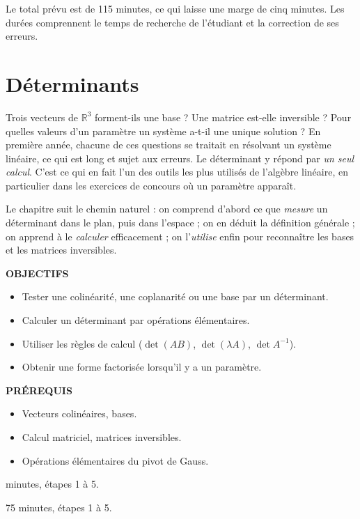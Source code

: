 \documentclass[a4paper,11pt]{article}
\numberwithin{equation}{section}
\numberwithin{figure}{section}
\numberwithin{table}{section}
\theoremstyle{enonce}
\theoremstyle{exemple}
\theoremstyle{remarque}
\newcommand{\ouverture}[3]{%
  \begin{tcolorbox}[enhanced,colback=Fond,colframe=Fond,arc=0pt,boxrule=0pt,left=12pt,right=12pt,top=10pt,bottom=10pt,
     before skip=1.2em,after skip=1.6em]
  \begin{minipage}[t]{0.56\linewidth}
  {\sffamily\bfseries\small\color{Bleu}OBJECTIFS}\par\vspace{0.3em}\small #1
  \end{minipage}\hfill
  \begin{minipage}[t]{0.38\linewidth}
  {\sffamily\bfseries\small\color{Bleu}PRÉREQUIS}\par\vspace{0.3em}\small #2
  \ifx\relax#3\relax\else\par\vspace{0.6em}{\sffamily\bfseries\small\color{Bleu}DURÉE}\par\vspace{0.2em}\small #3\fi
  \end{minipage}
  \end{tcolorbox}}
\newcommand{\R}{\mathbb{R}}
\newif\ifonglets \ongletsfalse
\begin{document}
Le total prévu est de 115 minutes, ce qui laisse une marge de cinq minutes. Les durées comprennent le temps de
recherche de l'étudiant et la correction de ses erreurs.

\clearpage
\thispagestyle{plain}
\hypertarget{toc}{}
\renewcommand{\contentsname}{Sommaire}
\tableofcontents
\clearpage
{}
\ongletstrue

\clearpage
\section{Déterminants}

Trois vecteurs de $\R^3$ forment-ils une base ? Une matrice est-elle inversible ? Pour quelles valeurs d'un paramètre
un système a-t-il une unique solution ? En première année, chacune de ces questions se traitait en résolvant un
système linéaire, ce qui est long et sujet aux erreurs. Le déterminant y répond par \emph{un seul calcul}. C'est ce qui
en fait l'un des outils les plus utilisés de l'algèbre linéaire, en particulier dans les exercices de concours où un
paramètre apparaît.

Le chapitre suit le chemin naturel : on comprend d'abord ce que \emph{mesure} un déterminant dans le plan, puis dans
l'espace ; on en déduit la définition générale ; on apprend à le \emph{calculer} efficacement ; on l'\emph{utilise}
enfin pour reconnaître les bases et les matrices inversibles.

\ouverture{%
\begin{itemize}
\item Tester une colinéarité, une coplanarité ou une base par un déterminant.
\item Calculer un déterminant par opérations élémentaires.
\item Utiliser les règles de calcul ($\det(AB)$, $\det(\lambda A)$, $\det A^{-1}$).
\item Obtenir une forme factorisée lorsqu'il y a un paramètre.
\end{itemize}}{%
\begin{itemize}
\item Vecteurs colinéaires, bases.
\item Calcul matriciel, matrices inversibles.
\item Opérations élémentaires du pivot de Gauss.
\end{itemize}}{75 minutes, étapes 1 à 5.}
\end{document}
